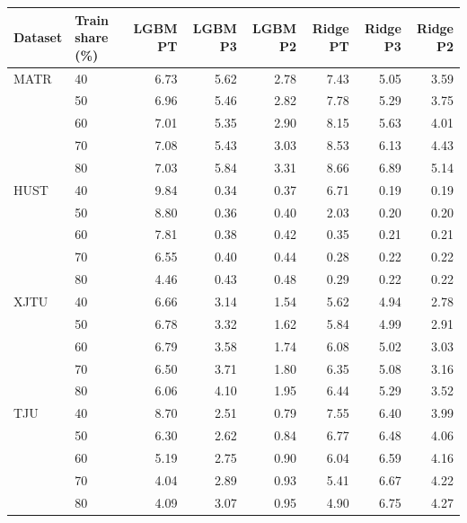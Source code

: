 \begin{tabular}{llrrrrrr}
\toprule
Dataset & Train share (\%) & LGBM PT & LGBM P3 & LGBM P2 & Ridge PT & Ridge P3 & Ridge P2 \\
\midrule
MATR & 40 & 6.73 & 5.62 & 2.78 & 7.43 & 5.05 & 3.59 \\
 & 50 & 6.96 & 5.46 & 2.82 & 7.78 & 5.29 & 3.75 \\
 & 60 & 7.01 & 5.35 & 2.90 & 8.15 & 5.63 & 4.01 \\
 & 70 & 7.08 & 5.43 & 3.03 & 8.53 & 6.13 & 4.43 \\
 & 80 & 7.03 & 5.84 & 3.31 & 8.66 & 6.89 & 5.14 \\
HUST & 40 & 9.84 & 0.34 & 0.37 & 6.71 & 0.19 & 0.19 \\
 & 50 & 8.80 & 0.36 & 0.40 & 2.03 & 0.20 & 0.20 \\
 & 60 & 7.81 & 0.38 & 0.42 & 0.35 & 0.21 & 0.21 \\
 & 70 & 6.55 & 0.40 & 0.44 & 0.28 & 0.22 & 0.22 \\
 & 80 & 4.46 & 0.43 & 0.48 & 0.29 & 0.22 & 0.22 \\
XJTU & 40 & 6.66 & 3.14 & 1.54 & 5.62 & 4.94 & 2.78 \\
 & 50 & 6.78 & 3.32 & 1.62 & 5.84 & 4.99 & 2.91 \\
 & 60 & 6.79 & 3.58 & 1.74 & 6.08 & 5.02 & 3.03 \\
 & 70 & 6.50 & 3.71 & 1.80 & 6.35 & 5.08 & 3.16 \\
 & 80 & 6.06 & 4.10 & 1.95 & 6.44 & 5.29 & 3.52 \\
TJU & 40 & 8.70 & 2.51 & 0.79 & 7.55 & 6.40 & 3.99 \\
 & 50 & 6.30 & 2.62 & 0.84 & 6.77 & 6.48 & 4.06 \\
 & 60 & 5.19 & 2.75 & 0.90 & 6.04 & 6.59 & 4.16 \\
 & 70 & 4.04 & 2.89 & 0.93 & 5.41 & 6.67 & 4.22 \\
 & 80 & 4.09 & 3.07 & 0.95 & 4.90 & 6.75 & 4.27 \\
\bottomrule
\end{tabular}
